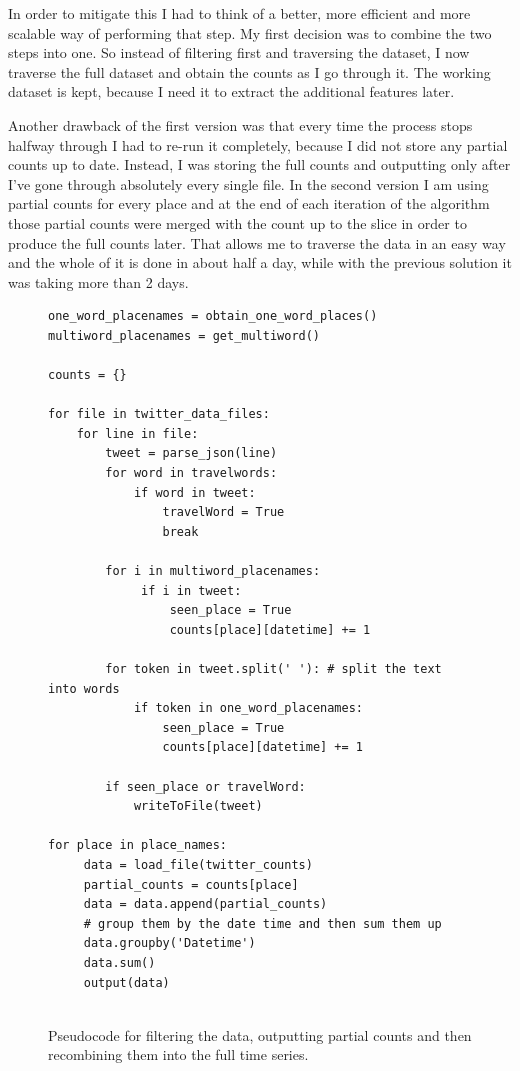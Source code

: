 \documentclass[minf,twoside,singlespacing,parskip,frontabs,notimes,11pt]{infthesis}
\begin{document}
In order to mitigate this I had to think of a better, more efficient and more scalable way of performing that step. My first decision was to combine the two steps into one. So instead of filtering first and traversing the dataset, I now traverse the full dataset and obtain the counts as I go through it. The working dataset is kept, because I need it to extract the additional features later. 

Another drawback of the first version was that every time the process stops halfway through I had to re-run it completely, because I did not store any partial counts up to date. Instead, I was storing the full counts and outputting only after I've gone through absolutely every single file. In the second version I am using partial counts for every place and at the end of each iteration of the algorithm those partial counts were merged with the count up to the slice in order to produce the full counts later. That allows me to traverse the data in an easy way and the whole of it is done in about half a day, while with the previous solution it was taking more than 2 days.

\begin{figure}[]
\begin{center}
\begin{lstlisting}
one_word_placenames = obtain_one_word_places()
multiword_placenames = get_multiword()

counts = {}

for file in twitter_data_files:
    for line in file:
        tweet = parse_json(line)
        for word in travelwords: 
            if word in tweet:
                travelWord = True
                break
                            
        for i in multiword_placenames:
             if i in tweet:
                 seen_place = True
                 counts[place][datetime] += 1
                            
        for token in tweet.split(' '): # split the text into words
            if token in one_word_placenames:
                seen_place = True
                counts[place][datetime] += 1

        if seen_place or travelWord:
            writeToFile(tweet)

for place in place_names:
     data = load_file(twitter_counts)
     partial_counts = counts[place]
     data = data.append(partial_counts)
     # group them by the date time and then sum them up
     data.groupby('Datetime')
     data.sum()
     output(data)
    
\end{lstlisting}
\end{center}
\caption{Pseudocode for filtering the data, outputting partial counts and then recombining them into the full time series. }
\end{figure}
\end{document}
